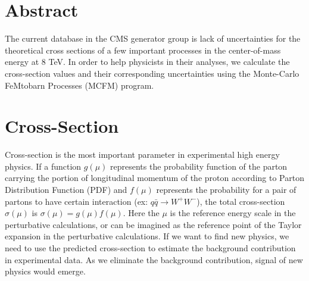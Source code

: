 \documentclass[a0,portrait]{a0poster}
\begin{document}
\begin{multicols}{2} %


\color{Black} %

\section*{\color{Crimson} Abstract}

The current database in the CMS generator group is lack of uncertainties for the theoretical cross sections of a few important processes in the center-of-mass energy at 8 TeV. In order to help physicists in their analyses, we calculate the cross-section values and their corresponding uncertainties using the Monte-Carlo FeMtobarn Processes (MCFM) program.


\section*{\color{Crimson} Cross-Section}

Cross-section is the most important parameter in experimental high energy physics. If a function  $g(\mu)$ represents the probability function of the parton carrying the portion of longitudinal momentum of the proton according to Parton Distribution Function (PDF) and $f(\mu)$ represents the probability for a pair of partons to have certain interaction (ex: $q\bar{q}\rightarrow W^+W^-$), the total cross-section $\sigma(\mu)$ is $\sigma(\mu)=g(\mu)f(\mu)$. Here the $\mu$ is the reference energy scale in the perturbative calculations, or can be imagined as the reference point of the Taylor expansion in the perturbative calculations. If we want to find new physics, we need to use the predicted cross-section to estimate the background contribution in experimental data. As we eliminate the background contribution, signal of new physics would emerge.



\end{multicols}
\end{document}

